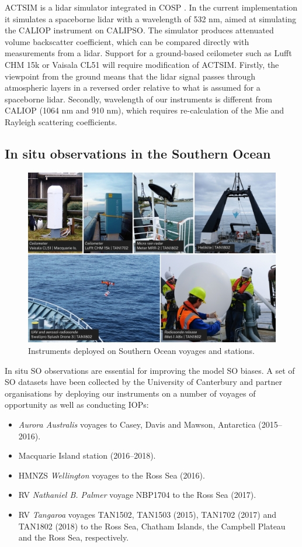 ACTSIM is a lidar simulator integrated in COSP
\citep{chepfer2008,chiriaco2006}. In the current implementation it simulates a
spaceborne lidar with a wavelength of 532 nm, aimed at simulating the CALIOP
instrument on CALIPSO. The simulator produces attenuated volume backscatter
coefficient, which can be compared directly with measurements from a lidar.
Support for a ground-based ceilometer such as Lufft CHM 15k or Vaisala CL51
will require modification of ACTSIM. Firstly, the viewpoint from
the ground means that the lidar signal passes through atmospheric layers in a reversed
order relative to what is assumed for a spaceborne lidar. Secondly,
wavelength of our instruments is different from CALIOP (1064 nm and 910 nm),
which requires re-calculation of the Mie and Rayleigh scattering coefficients.

\subsection{In situ observations in the Southern Ocean}

\begin{figure}[t]
\centering
\includegraphics[width=\textwidth]{fig/instruments.jpg}
\caption{
Instruments deployed on Southern Ocean voyages and stations.
}
\label{fig:instruments}
\end{figure}

In situ SO observations are essential for improving the model SO biases.
A set of SO datasets have been collected by the University of Canterbury
and partner organisations by deploying our instruments on a number
of voyages of opportunity as well as conducting IOPs:

\begin{itemize}
\item \textit{Aurora Australis} voyages to Casey, Davis and Mawson, Antarctica (2015--2016).
\item Macquarie Island station (2016--2018).
\item HMNZS \textit{Wellington} voyages to the Ross Sea (2016).
\item RV \textit{Nathaniel B. Palmer} voyage NBP1704 to the Ross Sea (2017).
\item RV \textit{Tangaroa} voyages TAN1502, TAN1503 (2015), TAN1702 (2017) and TAN1802 (2018)
to the Ross Sea, Chatham Islands, the Campbell Plateau and the Ross Sea, respectively.
\end{itemize}

